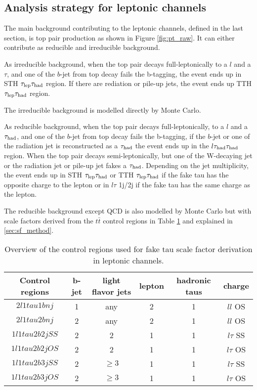 \subsection{Analysis strategy for leptonic channels}

The main background contributing to the leptonic channels, defined in the last section, is top pair production as shown in Figure \ref{fig:pt_raw}. It can either contribute as reducible and irreducible background.

As irreducible background, when the top pair decays full-leptonically to a $l$ and a $\tau$, and one of the $b$-jet from top decay fails the b-tagging, the event ends up in STH $\tau_\text{lep}{}\tau_\text{had}$ region. If there are rediation or pile-up jets, the event ends up TTH $\tau_\text{lep}{}\tau_\text{had}$ region.

The irreducible background is modelled directly by Monte Carlo.

As reducible background, when the top pair decays full-leptonically, to a $l$ and a $\tau_\text{had}$, and one of the $b$-jet from top decay fails the b-tagging, if the $b$-jet or one of the radiation jet is reconstructed as a $\tau_\text{had}$ the event ends up in the $l\tau_\text{had}{}\tau_\text{had}$ region. When the top pair decays semi-leptonically, but one of the W-decaying jet or the radiation jet or pile-up jet fakes a $\tau_\text{had}$. Depending on the jet multiplicity, the event ends up in STH $\tau_\text{lep}{}\tau_\text{had}$ or TTH $\tau_\text{lep}{}\tau_\text{had}$ if the fake tau has the opposite charge to the lepton or in $l\tau$ 1j/2j if the fake tau has the same charge as the lepton. 

The reducible background except QCD is also modelled by Monte Carlo but with scale factors derived from the $t\bar{t}$ control regions in Table \ref{tab:sfcr} and explained in \ref{sec:sf_method}.

\begin{table}
\centering
\caption{Overview of the control regions used for fake tau scale factor derivation in leptonic channels.}
\label{tab:sfcr}
\begin{tabular}[h]{c|c|c|c|c|c}
\hline \hline
Control regions & b-jet & light flavor jets	& lepton & hadronic taus & charge\\ \hline
$2l1tau1bnj$	& 1     & any				& 2      & 1			 & $ll$ OS\\ \hline
$2l1tau2bnj$	& 2     & any				& 2      & 1			 & $ll$ OS\\ \hline
$1l1tau2b2j SS$	& 2     & 2 				& 1      & 1             & $l\tau$ SS\\ \hline
$1l1tau2b2j OS$	& 2     & 2      			& 1      & 1             & $l\tau$ OS\\ \hline
$1l1tau2b3j SS$	& 2     & $\ge3$ 			& 1      & 1             & $l\tau$ SS\\ \hline
$1l1tau2b3j OS$	& 2     & $\ge3$      		& 1      & 1             & $l\tau$ OS\\ \hline
\end{tabular}
\end{table}

